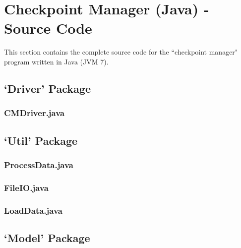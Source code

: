 \documentclass[a4paper, 10pt]{article}
\begin{document}


\clearpage
\section{Checkpoint Manager (Java) - Source Code}
This section contains the complete source code for the ``checkpoint manager" program written in Java (JVM 7).

\subsection{`Driver' Package}

\subsubsection{CMDriver.java}


\clearpage
\subsection{`Util' Package}

\subsubsection{ProcessData.java}


\subsubsection{FileIO.java}


\subsubsection{LoadData.java}


\clearpage
\subsection{`Model' Package}
\end{document}
